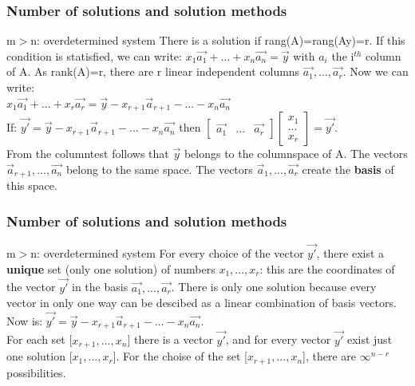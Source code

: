 \begin{frame}
	\frametitle{Number of solutions and solution methods}
	\begin{block}{m$>$n: overdetermined system}
		There is a solution if rang(A)=rang(Ay)=r. If this condition is statisfied, we can write: $x_1\overrightarrow{a_1}+...+x_n\overrightarrow{a_n}=\overrightarrow{y}$ with $a_i$ the i$^{th}$ column of A. As rank(A)=r, there are r linear independent columns
		$\overrightarrow{a_1},..., \overrightarrow{a_r}$. Now we can write: \\
		$x_1\overrightarrow{a_1}+...+x_r\overrightarrow{a_r}=\overrightarrow{y}-x_{r+1}\overrightarrow{a}_{r+1}-...-x_n\overrightarrow{a_n}$\\
		If: $\overrightarrow{y'}=\overrightarrow{y}-x_{r+1}\overrightarrow{a}_{r+1}-...-x_n\overrightarrow{a_n}$ then $\begin{bmatrix}
		\overrightarrow{a_1} & ... & \overrightarrow{a_r}
		\end{bmatrix} \begin{bmatrix}
		x_1\\...\\x_r
		\end{bmatrix}=\overrightarrow{y'}$. \\
		From the columntest follows that $\overrightarrow{y}$ belongs to the columnspace of A. The vectors $\overrightarrow{a}_{r+1},...,\overrightarrow{a_n}$ belong to the same space. The vectors $\overrightarrow{a}_{1},...,\overrightarrow{a_r}$ create the \textbf{basis} of this space.
	\end{block}
\end{frame}

\begin{frame}
	\frametitle{Number of solutions and solution methods}
	\begin{block}{m$>$n: overdetermined system}
		For every choice of the vector $\overrightarrow{y'}$, there exist a \textbf{unique} set (only one solution) of numbers $x_1,...,x_r$: this are the coordinates of the vector $\overrightarrow{y'}$ in the basis $\overrightarrow{a_1},...,\overrightarrow{a_r}$. There is only one solution because every vector in only one way can be descibed as a linear combination of basis vectors. \\
		Now is: $\overrightarrow{y'}=\overrightarrow{y}-x_{r+1}\overrightarrow{a}_{r+1}-...-x_n\overrightarrow{a_n}$. \\
		For each set [$x_{r+1},...,x_{n}$] there is a vector $\overrightarrow{y'}$, and for every vector $\overrightarrow{y'}$ exist just one solution [$x_1,...,x_r$]. For the choise of the set [$x_{r+1},...,x_{n}$], there are $\infty ^{n-r}$ possibilities.
	\end{block}
\end{frame}


